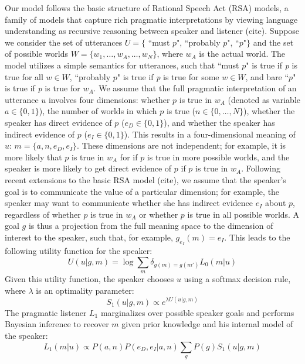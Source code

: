 \documentclass[12pt]{article}
\begin{document}
Our model follows the basic structure of Rational Speech Act (RSA) models, a family of models that capture rich pragmatic interpretations by viewing language understanding as recursive reasoning between speaker and listener (cite). Suppose we consider the set of utterances $U = \{$ ``must $p$", ``probably $p$", ``$p$"$\}$ and the set of possible worlds $W = \{w_1, \dots, w_A, \dots, w_N\}$, where $w_A$ is the actual world. The model utilizes a simple semantics for utterances, such that ``must $p$" is true if \emph{p} is true for all $w \in W$, ``probably $p$" is true if \emph{p} is true for some $w \in W$, and bare ``$p$" is true if \emph{p} is true for $w_A$.  We assume that the full pragmatic interpretation of an utterance $u$ involves four dimensions: whether $p$ is true in $w_A$ (denoted as variable $a \in \{0, 1\}$), the number of worlds in which $p$ is true ($n \in \{0, \dots, N\} $), whether the speaker has direct evidence of $p$ ($e_D \in \{0, 1\}$), and whether the speaker has indirect evidence of $p$ ($e_I \in \{0, 1\}$). This results in a four-dimensional meaning of $u$: $m = \{a, n, e_D, e_I\}$. These dimensions are not independent; for example, it is more likely that $p$ is true in $w_A$ for if $p$ is true in more possible worlds, and the speaker is more likely to get direct evidence of $p$ if $p$ is true in $w_A.$ Following recent extensions to the basic RSA model (cite), we assume that the speaker's goal is to communicate the value of a particular dimension; for example, the speaker may want to communicate whether she has indirect evidence $e_I$ about $p$, regardless of whether $p$ is true in $w_A$ or whether $p$ is true in all possible worlds. A goal $g$ is thus a projection from the full meaning space to the dimension of interest to the speaker, such that, for example, $g_{e_I}(m) =e_I$. This leads to the following utility function for the speaker:
\begin{equation}
U(u | g, m) = \log \sum_{m} \delta_{g(m)=g(m')} L_0(m |u)
\end{equation}
Given this utility function, the speaker chooses $u$ using a softmax decision rule, where $\lambda$ is an optimality parameter:
\begin{equation}
S_1(u | g, m) \propto e^{\lambda U(u | g, m)}
\end{equation}
The pragmatic listener $L_1$ marginalizes over possible speaker goals and performs Bayesian inference to recover $m$ given prior knowledge and his internal model of the speaker:
$$
L_1 (m | u) \propto P(a, n) P(e_D, e_I | a, n) \sum_{g}{P (g) S_1 (u|g, m)}
$$
\end{document}
